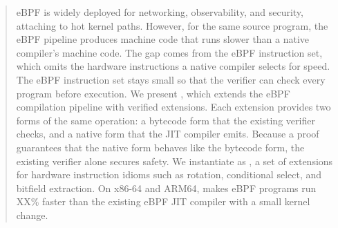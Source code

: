 




\begin{abstract}
eBPF is widely deployed for networking, observability, and security, attaching to hot kernel paths. However, for the same source program, the eBPF pipeline produces machine code that runs slower than a native compiler's machine code. The gap comes from the eBPF instruction set, which omits the hardware instructions a native compiler selects for speed. The eBPF instruction set stays small so that the verifier can check every program before execution.
%
We present \tool, which extends the eBPF compilation pipeline with verified extensions. Each \tool extension provides two forms of the same operation: a bytecode form that the existing verifier checks, and a native form that the JIT compiler emits. Because a proof guarantees that the native form behaves like the bytecode form, the existing verifier alone secures safety. We instantiate \tool as \lang, a set of extensions for hardware instruction idioms such as rotation, conditional select, and bitfield extraction. On x86-64 and ARM64, \lang makes eBPF programs run XX\% faster than the existing eBPF JIT compiler with a small kernel change.
\end{abstract}

